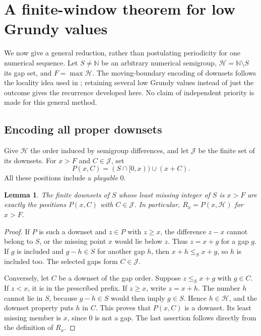 \documentclass[11pt,letterpaper]{article}
\numberwithin{equation}{section}
\newtheorem{lemma}[theorem]{Lemma}
\theoremstyle{definition}
\theoremstyle{remark}
\newcommand{\N}{\mathbb N}
\newcommand{\J}{\mathcal J}
\newcommand{\HH}{\mathcal H}
\begin{document}
\section{A finite-window theorem for low Grundy values}\label{sec:window}

We now give a general reduction, rather than postulating periodicity
for one numerical sequence. Let $S\ne\N$ be an arbitrary numerical
semigroup, $\HH=\N\setminus S$ its gap set, and $F=\max\HH$.
The moving-boundary encoding of downsets follows the locality idea
used in \cite[Section 6]{GMK18}; retaining several low Grundy values
instead of just the outcome gives the recurrence developed here.
No claim of independent priority is made for this general method.

\subsection{Encoding all proper downsets}

Give $\HH$ the order induced by semigroup differences, and let
$\J$ be the finite set of its downsets. For $x>F$ and $C\in\J$, set
\begin{equation}\label{eq:Pxc}
 P(x,C)=(S\cap[0,x))\cup(x+C).
\end{equation}
All these positions include a \emph{playable} 0.

\begin{lemma}\label{lem:tails}
The finite downsets of $S$ whose least missing integer of $S$ is
$x>F$ are exactly the positions $P(x,C)$ with $C\in\J$.
In particular, $R_x=P(x,\HH)$ for $x>F$.
\end{lemma}
\begin{proof}
If $P$ is such a downset and $z\in P$ with $z\geq x$, the difference
$z-x$ cannot belong to $S$, or the missing point $x$ would lie below
$z$. Thus $z=x+g$ for a gap $g$. If $g$ is included and $g-h\in S$
for another gap $h$, then $x+h\leq_S x+g$, so $h$ is included too.
The selected gaps form $C\in\J$.

Conversely, let $C$ be a downset of the gap order. Suppose
$z\leq_S x+g$ with $g\in C$. If $z<x$, it is in the prescribed
prefix. If $z\geq x$, write $z=x+h$. The number $h$ cannot lie
in $S$, because $g-h\in S$ would then imply $g\in S$. Hence
$h\in\HH$, and the downset property puts $h$ in $C$.
This proves that $P(x,C)$ is a downset. Its least missing member
is $x$, since 0 is not a gap. The last assertion follows directly
from the definition of $R_x$.
\end{proof}
\end{document}
